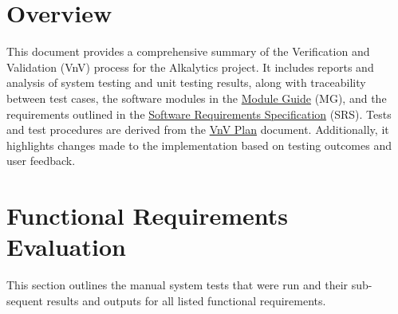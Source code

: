\documentclass[12pt, titlepage]{article}
\begin{document}
\newpage

\tableofcontents

\listoftables %

\newpage


\section{Overview}
This document provides a comprehensive summary of the Verification and
Validation (VnV) process for the Alkalytics project. It includes reports and
analysis of system testing and unit testing results, along with traceability
between test cases, the software modules in the
\href{https://github.com/SumanyaG/Alkalytics/blob/main/docs/Design/MG.pdf}{Module
Guide} (MG), and the requirements outlined in the
\href{https://github.com/SumanyaG/Alkalytics/blob/main/docs/SRS/SRS.pdf}{Software
Requirements Specification} (SRS). Tests and test procedures are derived from the \href{https://github.com/SumanyaG/Alkalytics/blob/main/docs/VnVPlan/VnVPlan.pdf}{VnV Plan} document. Additionally, it highlights changes made to the
implementation based on testing outcomes and user feedback.

\section{Functional Requirements Evaluation}
This section outlines the manual system tests that were run and their sub-
sequent results and outputs for all listed functional requirements.
\end{document}
